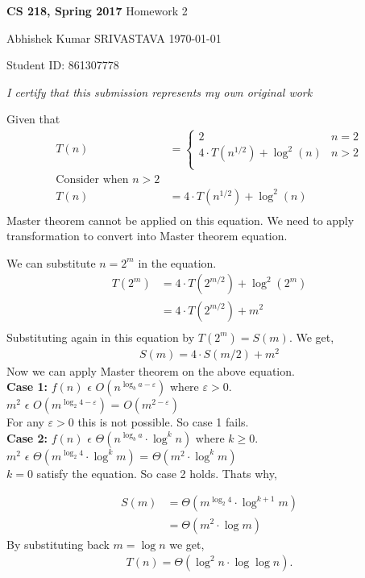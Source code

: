 \documentclass[a4paper,11pt]{article}
\renewcommand{\maketitle}{%
	
	\Large
 	\textbf{CS 218, Spring 2017}
 	\hfill
 	Homework 2
 	\par
 	
	\Large
	Abhishek Kumar SRIVASTAVA
	\hfill
	\normalsize
	\today
 	\par
 	Student ID: 861307778
 	\par
 	
 	\begin{center}

 	\vspace{.2in}
 	
 	\textit{I certify that this submission represents my own original work }
 	\par
	\vspace{.2in}
	\makebox[3.0in]{\hrulefill}
	\par

 	\end{center}
 	
 	\hrulefill
 	\par \vspace{2ex}
 	}
\theoremstyle{quest}
\newenvironment{solution}[2][Solution]{\begin{trivlist}
		\item[\hskip \labelsep {\bfseries #1}\hskip \labelsep {\bfseries #2.}]}{\end{trivlist}}
\begin{document}
\thispagestyle{empty}
	
\maketitle

\begin{solution}1	
	Given that 
	\begin{align*}
	T(n)&=\begin{cases}
	2 & \text{$n = 2$}\\
	4 \cdot T({n}^{1/2}) + {\log}^2(n) & \text{$n > 2$} \\
	\end{cases}\\
	\text{Consider when $n > 2$}\\
	T(n)&= 4 \cdot T({n}^{1/2}) + {\log}^2(n) \\
	\end{align*}
	Master theorem cannot be applied on this equation. We need to apply transformation to convert into Master theorem equation.
	
	We can substitute $n = 2^m$ in the equation.
	\begin{align*}
	T(2^m)&= 4 \cdot T(2^{m/2}) + \log^2(2^m) \\
	&=  4 \cdot T(2^{m/2}) + m^2 \\
	\end{align*}
	Substituting again in this equation by $T(2^m) = S(m)$. We get,
	\begin{align*}
	S(m) = 4 \cdot S(m/2) + m^2
	\end{align*}
	Now we can apply Master theorem on the above equation.\\

	\textbf{Case 1:} $f(n)$ $\epsilon$ $O(n^{\log_b{a} - \varepsilon})$ where $\varepsilon > 0$.\\
	
	$m^2$ $\epsilon$ $O(m^{\log_2{4} - \varepsilon})$ = $O(m^{2 - \varepsilon})$\\
	
	For any $\varepsilon > 0$ this is not possible. So case 1 fails.\\
	
	\textbf{Case 2:} $f(n)$ $\epsilon$ $\Theta(n^{\log_b{a}}\cdot \log^k n)$ where $k \ge 0$.\\
	
	$m^2$ $\epsilon$ $\Theta(m^{\log_2{4}}\cdot \log^k m)$ = $\Theta(m^{2}\cdot \log^k m)$\\
	
	$k = 0$ satisfy the equation. So case 2 holds. Thats why,
	
	\begin{align*}
	S(m) &= \Theta(m^{\log_2{4}}\cdot \log^{k+1}m)\\
	&= \Theta(m^{2}\cdot \log{m})
	\end{align*}
	By substituting back $m = \log{n}$ we get,
	\begin{align*}
	T(n) = \Theta(\log^2{n}\cdot \log{\log{n}}).
	\end{align*}
\end{solution}
\end{document}
